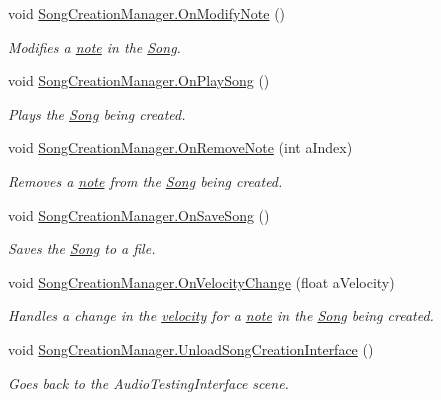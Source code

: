 \begin{DoxyCompactItemize}
void \hyperlink{group___s_c_m_handlers_gaf12d6326ad2175a51f688504372be784}{Song\+Creation\+Manager.\+On\+Modify\+Note} ()
\begin{DoxyCompactList}\small\item\em Modifies a \hyperlink{group___music_structs_struct_music_1_1_combined_note}{note} in the \hyperlink{class_song}{Song}. \end{DoxyCompactList}\item 
void \hyperlink{group___s_c_m_handlers_gafb394a0b00c8f9c0959d901faf9131c7}{Song\+Creation\+Manager.\+On\+Play\+Song} ()
\begin{DoxyCompactList}\small\item\em Plays the \hyperlink{class_song}{Song} being created. \end{DoxyCompactList}\item 
void \hyperlink{group___s_c_m_handlers_ga1f1e9a15a6c339282fb94085d4862605}{Song\+Creation\+Manager.\+On\+Remove\+Note} (int a\+Index)
\begin{DoxyCompactList}\small\item\em Removes a \hyperlink{group___music_structs_struct_music_1_1_combined_note}{note} from the \hyperlink{class_song}{Song} being created. \end{DoxyCompactList}\item 
void \hyperlink{group___s_c_m_handlers_gafd5e9f72e7a15cb77994c59fbbf8b769}{Song\+Creation\+Manager.\+On\+Save\+Song} ()
\begin{DoxyCompactList}\small\item\em Saves the \hyperlink{class_song}{Song} to a file. \end{DoxyCompactList}\item 
void \hyperlink{group___s_c_m_handlers_ga45e79bb31be34e3e2cc47bd6a6563b40}{Song\+Creation\+Manager.\+On\+Velocity\+Change} (float a\+Velocity)
\begin{DoxyCompactList}\small\item\em Handles a change in the \hyperlink{group___audio_DefVel}{velocity} for a \hyperlink{group___music_structs_struct_music_1_1_combined_note}{note} in the \hyperlink{class_song}{Song} being created. \end{DoxyCompactList}\item 
void \hyperlink{group___s_c_m_handlers_gac39b0d849c680dda1e047c3e7d848b51}{Song\+Creation\+Manager.\+Unload\+Song\+Creation\+Interface} ()
\begin{DoxyCompactList}\small\item\em Goes back to the Audio\+Testing\+Interface scene. \end{DoxyCompactList}\end{DoxyCompactItemize}


